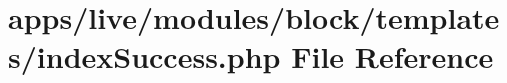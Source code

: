 \hypertarget{live_2modules_2block_2templates_2index_success_8php}{\section{apps/live/modules/block/templates/index\-Success.php File Reference}
\label{live_2modules_2block_2templates_2index_success_8php}
}
